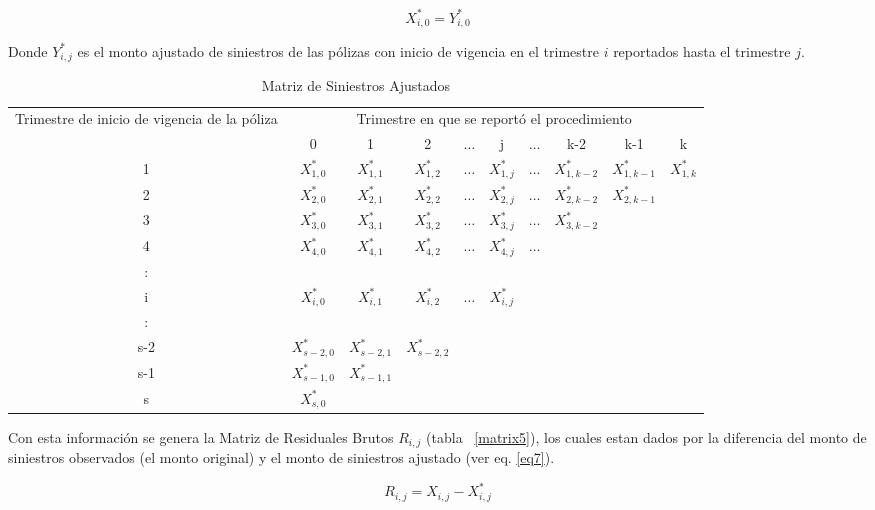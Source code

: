 \documentclass[11pt,twoside,openright,spanish]{report}
\numberwithin{equation}{chapter}
\numberwithin{figure}{chapter}
\numberwithin{table}{chapter}
\begin{document}
	$${X}_{i,0}^{*}={Y}_{i,0}^{*}$$ 
	
	Donde ${Y}_{i,j}^{*}$ es el monto ajustado de siniestros de las pólizas con inicio de vigencia en el trimestre $i$ reportados hasta el trimestre $j$. 
	
	\begin{table}[ht]
		\centering
		\begin{tabularx}{\linewidth}{ c|ccccccccc}
		\multirow{2}{4cm}{Trimestre de inicio de vigencia de la póliza}&  \multicolumn{9}{c}{Trimestre en que se reportó el procedimiento} \\
			& 0  & 1 & 2 & $ \dots $ & j & $\dots $ & k-2 & k-1 &  k \\
			\midrule
			1      &  $X_{1,0}^{*}$ & $X_{1,1}^{*}$ & $X_{1,2}^{*}$ & $ \dots $ & $X_{1,j}^{*}$ & $ \dots $ & $X_{1,k-2}^{*}$ & $X_{1,k-1}^{*}$ & $X_{1,k}^{*}$ \\
			2      &  $X_{2,0}^{*}$ & $X_{2,1}^{*}$ & $X_{2,2}^{*}$ & $ \dots $ & $X_{2,j}^{*}$ & $ \dots $ & $X_{2,k-2}^{*}$ & $X_{2,k-1}^{*}$ & \\
			3      &  $X_{3,0}^{*}$ & $X_{3,1}^{*}$ & $X_{3,2}^{*}$ & $ \dots $ & $X_{3,j}^{*}$ & $ \dots $ & $X_{3,k-2}^{*}$ & & \\
			4      &  $X_{4,0}^{*}$ & $X_{4,1}^{*}$ & $X_{4,2}^{*}$ & $ \dots $ & $X_{4,j}^{*}$ & $ \dots $ & & & \\
			:      & & & & & & & & &\\
			i      &  $X_{i,0}^{*}$ & $X_{i,1}^{*}$ & $X_{i,2}^{*}$ & $ \dots $ & $X_{i,j}^{*}$ & & & & \\
			:      & & & & & & & & & \\
			s-2      &  $X_{s-2,0}^{*}$ & $X_{s-2,1}^{*}$ & $X_{s-2,2}^{*}$ & & & & & & \\
			s-1      &  $X_{s-1,0}^{*}$ & $X_{s-1,1}^{*}$ & & & & & & & \\
			s      &  $X_{s,0}^{*}$ & & & & & & & & \\
		\end{tabularx}
				\caption{Matriz de Siniestros  Ajustados}
				\label{matrix4}
	\end{table}
		
	Con esta información se genera la Matriz de Residuales Brutos $R_{i,j}^{}$ (tabla ~\ref{matrix5}), los cuales estan dados por la diferencia del monto de siniestros observados (el monto original) y el monto de siniestros ajustado  (ver eq. \ref{eq7}).
		
	\begin{equation}
	R_{i,j}^{}= X_{i,j}^{} - X_{i,j}^{*} 
	\label{eq7}
	\end{equation}
	
\end{document}

